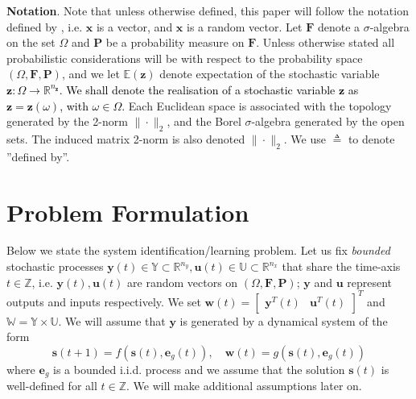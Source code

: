 \documentclass{ifacconf}
\def\rve{{\mathbf{e}}}
\def\rvu{{\mathbf{i}}}
\def\rvs{{\mathbf{s}}}
\def\rvu{{\mathbf{u}}}
\def\rvw{{\mathbf{w}}}
\def\rvx{{\mathbf{x}}}
\def\rvy{{\mathbf{y}}}
\def\rvz{{\mathbf{z}}}
\def\vx{{\bm{x}}}
\def\vz{{\bm{z}}}
\def\sU{{\mathbb{U}}}
\def\sW{{\mathbb{W}}}
\def\sY{{\mathbb{Y}}}
\def\sZ{{\mathbb{Z}}}
\newcommand{\E}{\mathbb{E}}
\newcommand{\reals}{\mathbb{R}}
\newcommand{\bP}{\mathbf{P}}
\newcommand{\F}{\mathbf{F}}
\newcommand{\aseq}{\overset{\text{a.s.}}{=}}
\newcommand{\deividas}[1]{\textcolor{black}{ #1}} %
\begin{document}
\textbf{Notation}.
Note that unless otherwise defined, this paper will follow the notation defined by \citet{goodfellow2016deep}, i.e.  $\vx$ is a vector, and $\rvx$ is a random vector.
Let $\F$ denote a $\sigma$-algebra on the set $\Omega$ and $\bP$ be a probability measure on $\F$. Unless otherwise stated all probabilistic considerations will be with respect to the probability space $(\Omega,\F,\bP)$, and we let $\E(\rvz)$ denote expectation of the stochastic variable \deividas{$\rvz:\Omega\rightarrow\reals^{n_\rvz}$. We shall denote the realisation of a stochastic variable $\rvz$ as $\vz=\rvz(\omega)$, with $\omega\in\Omega$.}
Each Euclidean space is associated with the topology generated by the 2-norm $\|\cdot\|_2$, and the Borel $\sigma$-algebra generated by the open sets. The induced matrix 2-norm is also denoted $\|\cdot\|_2$. 
We use $\triangleq$ to denote ''defined by''.%

\section{Problem Formulation}

\label{sec:prelim}

Below  we state the system identification/learning problem.
 Let us fix \emph{bounded} stochastic processes $\rvy(t)\in \sY\subset \reals^{n_y},\rvu(t)\in \sU \subset \reals^{n_x}$ that share the time-axis $t\in\sZ$, i.e. $\rvy(t),\rvu(t)$ are random vectors on $(\Omega,\F,\bP)$; $\rvy$ and $\rvu$ represent outputs and inputs respectively.
 We set $\rvw(t)=\begin{bmatrix} \rvy^T(t)& \rvu^T(t) \end{bmatrix}^T$ and $\sW=\sY \times \sU$.  We will assume that $\rvy$ is generated by
 a dynamical system of the form
 \begin{equation}\label{eq:gen}
    \rvs(t+1)=f(\rvs(t),\rve_g(t)), \quad  \rvw(t) =g(\rvs(t),\rve_g(t)) 
\end{equation}
where $\rve_g$ is a bounded i.i.d. process and we assume that the solution $\rvs(t)$ is well-defined for all $t \in \mathbb{Z}$. We will make additional
assumptions later on.
\end{document}
